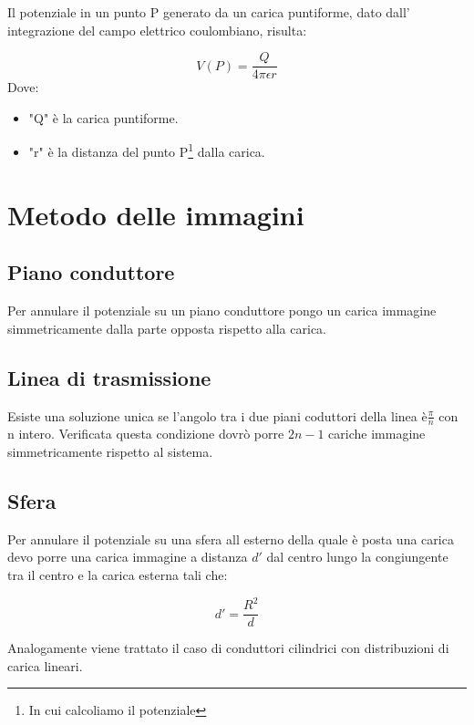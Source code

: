 \documentclass[10pt,a4paper]{report}
\begin{document}
		Il potenziale in un punto P generato da un carica puntiforme, dato dall' integrazione del campo elettrico coulombiano, risulta:

		\begin{equation}
		V(P)=\frac{Q}{4\pi \epsilon r}
		\end{equation}
		Dove:
		\begin{itemize}
		\item "Q" è la carica puntiforme.

		\item "r" è la distanza del punto P\footnote{In cui calcoliamo il potenziale} dalla carica.
		\end{itemize}

\chapter{Metodo delle immagini}	


	\section{Piano conduttore}

	Per annulare il potenziale su un piano conduttore pongo un carica immagine simmetricamente dalla parte opposta rispetto alla carica.

	\section{Linea di trasmissione}

	Esiste una soluzione unica se l'angolo tra i due piani coduttori della linea è$\frac{\pi}{n}$ con n intero.
	Verificata questa condizione dovrò porre $2n-1$ cariche immagine simmetricamente rispetto al sistema.

	\section{Sfera}

	Per annulare il potenziale su una sfera all esterno della quale è posta una carica devo porre una carica immagine a distanza $d'$ dal centro lungo la congiungente tra il centro e la carica esterna tali che:

	\begin{equation}
	d'=\frac{R^2}{d}
	\end{equation}

	Analogamente viene trattato il caso di conduttori cilindrici con distribuzioni di carica lineari.
\end{document}
